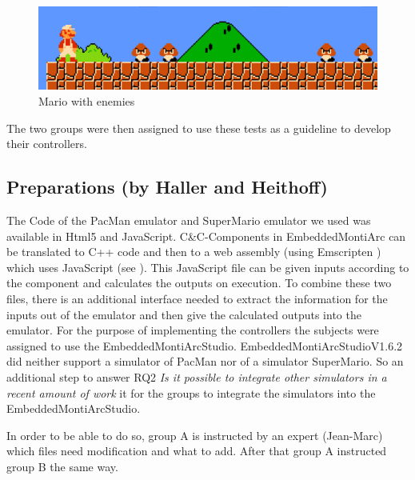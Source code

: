 \begin{figure}[!h]
	\centering
	\includegraphics[scale=0.55]{pictures/Mario4.PNG}
	\caption{Mario with enemies}
	\label{fig:marioFight}
\end{figure}

The two groups were then assigned to use these tests as a guideline to develop their controllers.

\subsection{Preparations (by Haller and Heithoff)}
The Code of the PacMan emulator \cite{pacmanLink} and SuperMario emulator \cite{marioLink} we used was available in Html5 and JavaScript. C\&C-Components in EmbeddedMontiArc can be translated to C++ code and then to a web assembly (using Emscripten \cite{emscirpten}) which uses JavaScript (see \cite{bertram2017component}). This JavaScript file can be given inputs according to the component and calculates the outputs on execution. To combine these two files, there is an additional interface needed to extract the information for the inputs out of the emulator and then give the calculated outputs into the emulator.
For the purpose of implementing the controllers the subjects were assigned to use the EmbeddedMontiArcStudio.
EmbeddedMontiArcStudioV1.6.2 did neither support a simulator of PacMan nor of a simulator SuperMario. So an additional step to answer RQ2 \textit{Is it possible to integrate other simulators in a recent amount of work} it for the groups to integrate the simulators into the EmbeddedMontiArcStudio.

In order to be able to do so, group A is instructed by an expert (Jean-Marc) which files need modification and what to add. After that group A instructed group B the same way.

